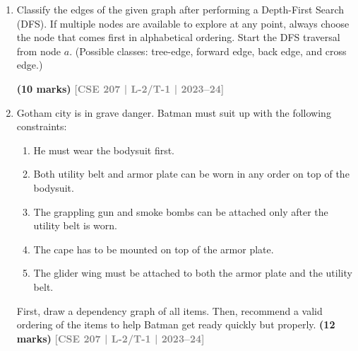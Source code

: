\documentclass[12pt,a3paper]{article}
\newcommand{\yr}[1]{\hfill\textcolor{gray}{\small\textbf{[#1]}}}
\newcommand{\mk}[1]{\textcolor{orange!70!black}{\small\textbf{(#1 marks)}}}
\begin{document}
\begin{enumerate}

\item Classify the edges of the given graph after performing a Depth-First Search (DFS). If multiple nodes are available to explore at any point, always choose the node that comes first in alphabetical ordering. Start the DFS traversal from node $a$. (Possible classes: tree-edge, forward edge, back edge, and cross edge.)
\begin{center}
\end{center}
\mk{10} \yr{CSE 207 | L-2/T-1 | 2023--24}

\item Gotham city is in grave danger. Batman must suit up with the following constraints:
\begin{enumerate}
\item  He must wear the bodysuit first. 
\item  Both utility belt and armor plate can be worn in any order on top of the bodysuit. 
\item  The grappling gun and smoke bombs can be attached only after the utility belt is worn.
\item  The cape has to be mounted on top of the armor plate. 
\item  The glider wing must be attached to both the armor plate and the utility belt. 
\end{enumerate}
  First, draw a dependency graph of all items. Then, recommend a valid ordering of the items to help Batman get ready quickly but properly.
\mk{12} \yr{CSE 207 | L-2/T-1 | 2023--24}


\end{enumerate}
\end{document}
